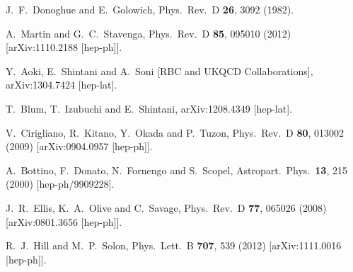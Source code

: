 \begin{thebibliography}{99}
  J.~F.~Donoghue and E.~Golowich,
  Phys.\ Rev.\ D {\bf 26}, 3092 (1982).
  
  A.~Martin and G.~C.~Stavenga,
  Phys.\ Rev.\ D {\bf 85}, 095010 (2012)
  [arXiv:1110.2188 [hep-ph]].
 
  Y.~Aoki, E.~Shintani and A.~Soni [RBC and UKQCD Collaborations],
  arXiv:1304.7424 [hep-lat].

  T.~Blum, T.~Izubuchi and E.~Shintani,
  arXiv:1208.4349 [hep-lat].
  
  V.~Cirigliano, R.~Kitano, Y.~Okada and P.~Tuzon,
  Phys.\ Rev.\ D {\bf 80}, 013002 (2009)
  [arXiv:0904.0957 [hep-ph]].

  A.~Bottino, F.~Donato, N.~Fornengo and S.~Scopel,
  Astropart.\ Phys.\  {\bf 13}, 215 (2000)
  [hep-ph/9909228].

  J.~R.~Ellis, K.~A.~Olive and C.~Savage,
  Phys.\ Rev.\ D {\bf 77}, 065026 (2008)
  [arXiv:0801.3656 [hep-ph]].

  R.~J.~Hill and M.~P.~Solon,
  Phys.\ Lett.\ B {\bf 707}, 539 (2012)
  [arXiv:1111.0016 [hep-ph]].


\end{thebibliography}
